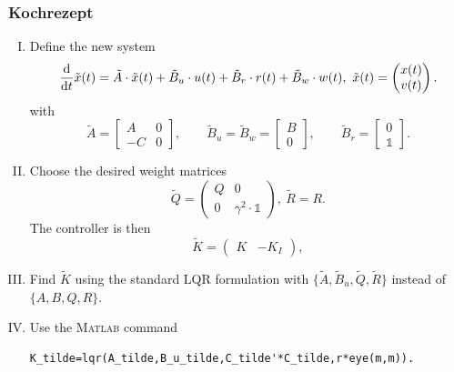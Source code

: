 \documentclass[a4paper,12 pt]{article}
\numberwithin{equation}{section}
\theoremstyle{definition}
\theoremstyle{remark}
\theoremstyle{definition}
\theoremstyle{definition}
\theoremstyle{definition}
\theoremstyle{remark}
\begin{document}
\subsubsection*{Kochrezept}
\begin{enumerate}[(I)]
\item Define the new system 
\begin{equation}
\frac{\text d}{\text{d}t}\tilde x(t)=\tilde A \cdot \tilde x(t)+ \tilde B_u\cdot u(t)+\tilde B_r \cdot r(t)+\tilde B_w \cdot w(t), \ \tilde{x}(t)=\begin{pmatrix} x(t) \\ v(t) \end{pmatrix}.
\end{equation}
with 
\begin{equation}
\tilde A=\begin{bmatrix} A & 0 \\ -C & 0 \end{bmatrix}, \qquad
\tilde B_u=\tilde B_w=\begin{bmatrix} B \\ 0 \end{bmatrix}, \qquad 
\tilde B_r=\begin{bmatrix} 0 \\ \mathbb{1} \end{bmatrix}.
\end{equation}
\item Choose the desired weight matrices 
\begin{equation}
\tilde{Q}=\begin{pmatrix}
Q&0\\
0&\gamma^2 \cdot \mathbb{1}
\end{pmatrix}, \ \tilde R=R.
\end{equation}
The controller is then 
\begin{equation}
\tilde{K}=\begin{pmatrix} 
K&-K_I
\end{pmatrix},
\end{equation}
\item Find $\tilde{K}$ using the standard LQR formulation with $\{ \tilde{A},\tilde{B}_u,\tilde{Q},\tilde{R} \}$ instead of $\{A,B,Q,R\}$.
\item Use the \textsc{Matlab} command
\begin{verbatim}
K_tilde=lqr(A_tilde,B_u_tilde,C_tilde'*C_tilde,r*eye(m,m)).
\end{verbatim}
\end{enumerate}
\newpage
\end{document}
